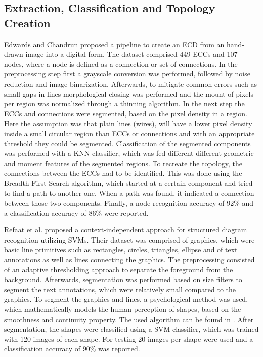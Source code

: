 \subsection{Extraction, Classification and Topology Creation}

Edwards and Chandrun proposed a pipeline to create an \ac{ECD} from an hand-drawn image into a digital form.
The dataset comprised 449 \acp{ECC} and 107 nodes, where a node is defined as a connection or set of connections.
In the preprocessing step first a grayscale conversion was performed, followed by noise reduction and image binarization.
Afterwards, to mitigate common errors such as small gaps in lines morphological closing was performed and the mount of pixels per region was normalized through a thinning algorithm.
In the next step the \acp{ECC} and connections were segmented, based on the pixel density in a region.
Here the assumption was that plain lines (wires), will have a lower pixel density inside a small circular region than \acp{ECC} or connections and with an appropriate threshold they could be segmented.
Classification of the segmented components was performed with a \ac{KNN} classifier, which was fed different different geometric and moment features of the segmented regions.
To recreate the topology, the connections between the \acp{ECC} had to be identified.
This was done using the Breadth-First Search algorithm, which started at a certain component and tried to find a path to another one.
When a path was found, it indicated a connection between those two components.
Finally, a node recognition accuracy of 92\% and a classification accuracy of 86\% were reported.

Refaat et al. \cite{ecd_ctxindependentsvm} proposed a context-independent approach for structured diagram recognition utilizing \acp{SVM}.
Their dataset was comprised of graphics, which were basic line primitives such as rectangles, circles, triangles, ellipse and of text annotations as well as lines connecting the graphics.
The preprocessing consisted of an adaptive thresholding approach to separate the foreground from the background.
Afterwards, segmentation was performed based on size filters to segment the text annotations, which were relatively small compared to the graphics.
To segment the graphics and lines, a psychological method was used, which mathematically models the human perception of shapes, based on the smoothness and continuity property.
The used algorithm can be found in \cite{line_primitive}.
After segmentation, the shapes were classified using a \ac{SVM} classifier, which was trained with 120 images of each shape.
For testing 20 images per shape were used and a classification accuracy of 90\% was reported.


